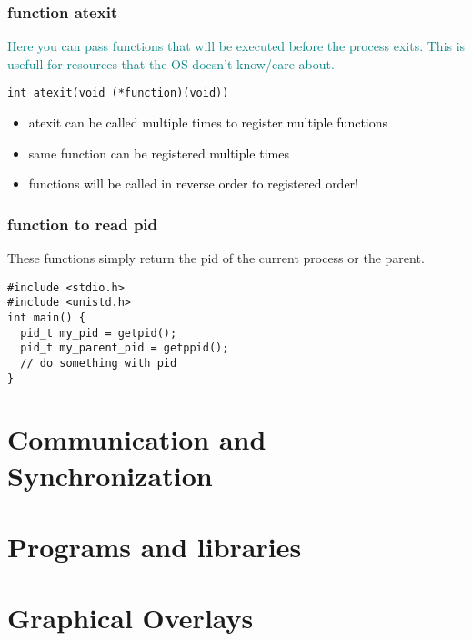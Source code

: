 \documentclass[main.tex,fontsize=8pt,paper=a4,paper=portrait,DIV=calc,]{scrartcl}
\begin{document}
\subsubsection{function atexit}
\textcolor{teal}{Here you can pass functions that will be executed before the process exits.\newline
This is usefull for resources that the OS doesn't know/care about.}
\begin{lstlisting}
int atexit(void (*function)(void))
\end{lstlisting}
\begin{itemize}
\item \textcolor{black}{atexit can be called multiple times to register multiple functions}
\item \textcolor{black}{same function can be registered multiple times}
\item \textcolor{black}{functions will be called in reverse order to registered order!}
\end{itemize} 

\subsubsection{function to read pid}
These functions simply return the pid of the current process or the parent.
\begin{lstlisting}
#include <stdio.h>
#include <unistd.h>
int main() {
  pid_t my_pid = getpid();
  pid_t my_parent_pid = getppid();
  // do something with pid
}
\end{lstlisting}

\section{Communication and Synchronization}

\section{Programs and libraries}

\section{Graphical Overlays}
\end{document}
